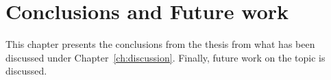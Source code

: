 \chapter{Conclusions and Future work}
\label{ch:conclusionsAndFutureWork}
This chapter presents the conclusions from the thesis from what has been discussed under Chapter~\ref{ch:discussion}. Finally, future work on the topic is discussed.





% 



% 